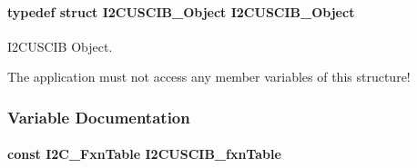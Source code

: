 \paragraph[{I2\-C\-U\-S\-C\-I\-B\-\_\-\-Object}]{\setlength{\rightskip}{0pt plus 5cm}typedef struct {\bf I2\-C\-U\-S\-C\-I\-B\-\_\-\-Object}  {\bf I2\-C\-U\-S\-C\-I\-B\-\_\-\-Object}}\label{_i2_c_u_s_c_i_b_8h_a4b7b87d6ac61e0808fde0cd44bc2aa08}


I2\-C\-U\-S\-C\-I\-B Object. 

The application must not access any member variables of this structure! 

\subsubsection{Variable Documentation}
\paragraph[{I2\-C\-U\-S\-C\-I\-B\-\_\-fxn\-Table}]{\setlength{\rightskip}{0pt plus 5cm}const {\bf I2\-C\-\_\-\-Fxn\-Table} I2\-C\-U\-S\-C\-I\-B\-\_\-fxn\-Table}\label{_i2_c_u_s_c_i_b_8h_a72eb489c9beee32e652431265a234cbd}
